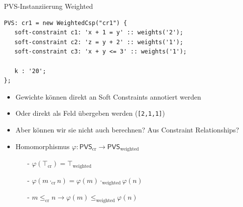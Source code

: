 \documentclass[handout,10pt,xcolor={dvipsnames},fleqn]{beamer}
\begin{document}
\begin{frame}[fragile]{PVS-Instanziierung Weighted}
\begin{lstlisting}
PVS: cr1 = new WeightedCsp("cr1") {
   soft-constraint c1: 'x + 1 = y' :: weights('2');
   soft-constraint c2: 'z = y + 2' :: weights('1');
   soft-constraint c3: 'x + y <= 3' :: weights('1');
   
   k : '20';
}; 
\end{lstlisting}
\begin{itemize}
\item Gewichte können direkt an Soft Constraints annotiert werden
\item Oder direkt als Feld übergeben werden (\texttt{[2,1,1]}) \pause 
\item Aber können wir sie nicht auch berechnen? Aus Constraint Relationships? \pause 
\item Homomorphismus $\varphi : \mathsf{PVS}_{\mathrm{cr}} \to  \mathsf{PVS}_{\mathrm{weighted}}$
\begin{itemize}
\item[-] $\varphi(\top_{\mathrm{cr}}) = \top_{\mathrm{weighted}}$
\item[-] $\varphi(m \cdot_{\mathrm{cr}} n) = \varphi(m) \cdot_{\mathrm{weighted}} \varphi(n)$
\item[-] $m \leq_{\mathrm{cr}} n \rightarrow \varphi(m) \leq_{\mathrm{weighted}} \varphi(n)$ 
\end{itemize}
\end{itemize}
\end{frame}
\end{document}
